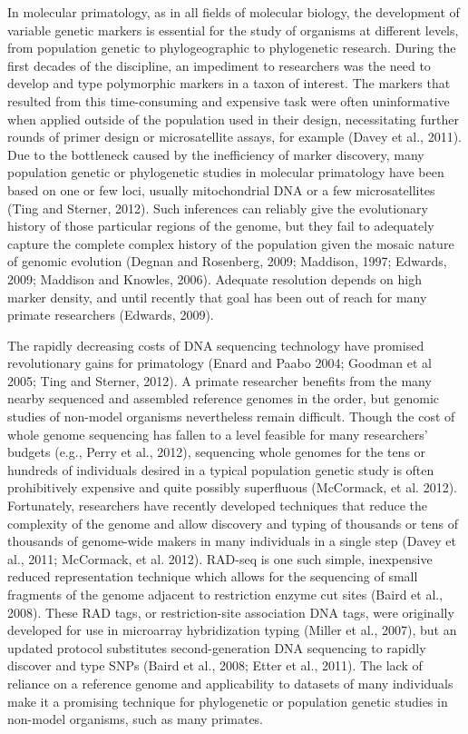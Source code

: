 \documentclass[12pt]{article}
\begin{document}
In molecular primatology, as in all fields of molecular biology, the development of variable genetic markers is essential for the study of organisms at different levels, from population genetic to phylogeographic to phylogenetic research. During the first decades of the discipline, an impediment to researchers was the need to develop and type polymorphic markers in a taxon of interest. The markers that resulted from this time-consuming and expensive task were often uninformative when applied outside of the population used in their design, necessitating further rounds of primer design or microsatellite assays, for example (Davey et al., 2011). Due to the bottleneck caused by the inefficiency of marker discovery, many population genetic or phylogenetic studies in molecular primatology have been based on one or few loci, usually mitochondrial DNA or a few microsatellites (Ting and Sterner, 2012). Such inferences can reliably give the evolutionary history of those particular regions of the genome, but they fail to adequately capture the complete complex history of the population given the mosaic nature of genomic evolution (Degnan and Rosenberg, 2009; Maddison, 1997; Edwards, 2009; Maddison and Knowles, 2006). Adequate resolution depends on high marker density, and until recently that goal has been out of reach for many primate researchers (Edwards, 2009).

The rapidly decreasing costs of DNA sequencing technology have promised revolutionary gains for primatology (Enard and Paabo 2004; Goodman et al 2005; Ting and Sterner, 2012). A primate researcher benefits from the many nearby sequenced and assembled reference genomes in the order, but genomic studies of non-model organisms nevertheless remain difficult. Though the cost of whole genome sequencing has fallen to a level feasible for many researchers' budgets (e.g., Perry et al., 2012), sequencing whole genomes for the tens or hundreds of individuals desired in a typical population genetic study is often prohibitively expensive and quite possibly superfluous (McCormack, et al. 2012). Fortunately, researchers have recently developed techniques that reduce the complexity of the genome and allow discovery and typing of thousands or tens of thousands of genome-wide makers in many individuals in a single step (Davey et al., 2011; McCormack, et al. 2012). RAD-seq is one such simple, inexpensive reduced representation technique which allows for the sequencing of small fragments of the genome adjacent to restriction enzyme cut sites (Baird et al., 2008). These RAD tags, or restriction-site association DNA tags, were originally developed for use in microarray hybridization typing (Miller et al., 2007), but an updated protocol substitutes second-generation DNA sequencing to rapidly discover and type SNPs (Baird et al., 2008; Etter et al., 2011). The lack of reliance on a reference genome and applicability to datasets of many individuals make it a promising technique for phylogenetic or population genetic studies in non-model organisms, such as many primates.
\end{document}
